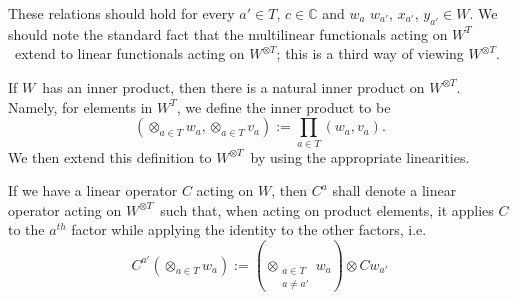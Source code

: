 \documentclass[11pt]{article}
\theoremstyle{remark}
\begin{document}
These relations should hold for every $\ensuremath{a}' \in
\ensuremath{T}$, $c \in \ensuremath{\mathbb{C}}$ and
 $\ensuremath{w}_\ensuremath{a}$ $ \ensuremath{w}_{\ensuremath{a}'}$,  $x_{\ensuremath{a}'}$, $y_{\ensuremath{a}'} \in
\ensuremath{W}$.    
We should note the standard fact that
the multilinear functionals acting on \ensuremath{{\ensuremath{W}}^{\ensuremath{T}}}\ extend to
linear functionals acting on \ensuremath{{\ensuremath{W}}^{{\otimes}{\ensuremath{T}}}}; this is a third way of viewing \ensuremath{{\ensuremath{W}}^{{\otimes}{\ensuremath{T}}}}.
 
If \ensuremath{W}\ has an inner product, then there is a natural inner
product on \ensuremath{{\ensuremath{W}}^{{\otimes}{\ensuremath{T}}}}. Namely, for elements in \ensuremath{{\ensuremath{W}}^{\ensuremath{T}}}, we define the inner
product to be 
\begin{equation*}\ensuremath{({\ensuremath{\mathop{\otimes}_{\ensuremath{a} \in \ensuremath{T}} \ensuremath{w}_{\ensuremath{a}} }}, {\ensuremath{\mathop{\otimes}_{\ensuremath{a} \in
\ensuremath{T}} {{v}_{\ensuremath{a}} }}})} \ensuremath{:=}
\prod_{\ensuremath{a} 
\in \ensuremath{T}} \ensuremath{({\ensuremath{w}_\ensuremath{a}}, {v_{\ensuremath{a}}})}.
\end{equation*} 
We then extend this definition to \ensuremath{{\ensuremath{W}}^{{\otimes}{\ensuremath{T}}}}\ by using the appropriate
linearities.  

 If we have a linear operator $C$ acting on \ensuremath{W}, then
$C^{\ensuremath{a}}$ shall denote a linear operator acting on \ensuremath{{\ensuremath{W}}^{{\otimes}{\ensuremath{T}}}}\ such
that, when acting 
on product elements, it applies $C$ to the 
  $\ensuremath{a}^{th}$
factor while applying the identity to the other factors, i.e.\ 
\begin{equation*}
C^{\ensuremath{a}'} (\ensuremath{\mathop{\otimes}_{\ensuremath{a} \in \ensuremath{T}} \ensuremath{w}_{\ensuremath{a}} }) \ensuremath{:=} \ensuremath{(\mathop{\otimes}_{ \substack{\ensuremath{a}
 \in \ensuremath{T} \\
 \ensuremath{a} \neq \ensuremath{a}'}} \ensuremath{w}_\ensuremath{a}) \otimes {{C w_{\ensuremath{a}'}} }}
\end{equation*} 
\end{document}
